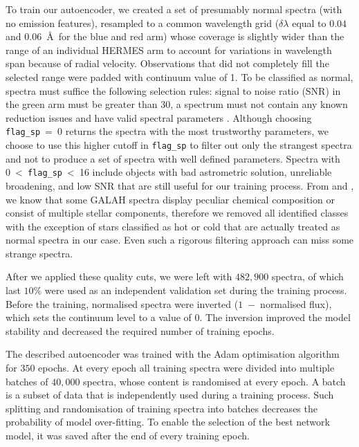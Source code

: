 To train our autoencoder, we created a set of presumably normal spectra (with no emission features), resampled to a common wavelength grid ($\delta \lambda$ equal to $0.04$ and $0.06$~\AA\ for the blue and red arm) whose coverage is slightly wider than the range of an individual HERMES arm to account for variations in wavelength span because of radial velocity. Observations that did not completely fill the selected range were padded with continuum value of 1. To be classified as normal, spectra must suffice the following selection rules: signal to noise ratio (SNR) in the green arm must be greater than $30$, a spectrum must not contain any known reduction issues \citep[\texttt{red\_flag}~=~0 in][]{2017MNRAS.464.1259K} and have valid spectral parameters \citep[\texttt{flag\_sp}~<~16 in Buder et al. in preparation][]{}. Although choosing \texttt{flag\_sp}~=~0 returns the spectra with the most trustworthy parameters, we choose to use this higher cutoff in \texttt{flag\_sp} to filter out only the strangest spectra and not to produce a set of spectra with well defined parameters. Spectra with 0~<~\texttt{flag\_sp}~<~16 include objects with bad astrometric solution, unreliable broadening, and low SNR that are still useful for our training process. From \citet{2017ApJS..228...24T, 2018MNRAS.478.4513B} and \citet{2019MNRAS.483.3196C}, we know that some GALAH spectra display peculiar chemical composition or consist of multiple stellar components, therefore we removed all identified classes with the exception of stars classified as hot or cold that are actually treated as normal spectra in our case. Even such a rigorous filtering approach can miss some strange spectra.

After we applied these quality cuts, we were left with $482,900$ spectra, of which last $10\%$ were used as an independent validation set during the training process. Before the training, normalised spectra were inverted ($1$~$-$~normalised flux), which sets the continuum level to a value of $0$. The inversion improved the model stability and decreased the required number of training epochs.

The described autoencoder was trained with the Adam optimisation algorithm \citep{2014arXiv1412.6980K} for $350$ epochs. At every epoch all training spectra were divided into multiple batches of $40,000$ spectra, whose content is randomised at every epoch. A batch is a subset of data that is independently used during a training process. Such splitting and randomisation of training spectra into batches decreases the probability of model over-fitting. To enable the selection of the best network model, it was saved after the end of every training epoch. 


